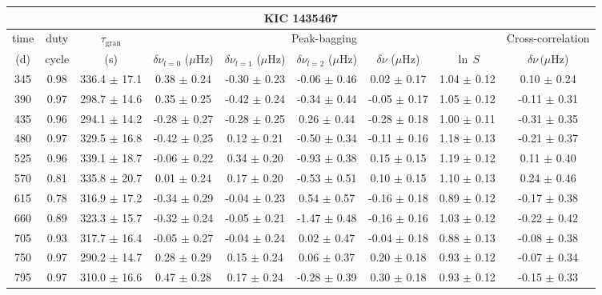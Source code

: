 \documentclass[twocolumn]{aastex61}%
\begin{document}
\FloatBarrier
\begin{table}\centering\fontsize{9.}{7.}\selectfont
\begin{tabular}{ccc|ccccc|c}
\multicolumn{9}{c}{KIC 1435467}\\ \hline\hline
time & duty & $\tau_\text{gran}$ &\multicolumn{5}{c|}{Peak-bagging}&Cross-correlation\\
(d)& cycle & (s)&$\delta\nu_{l=0}$ ($\mu$Hz) & $\delta\nu_{l=1}$ ($\mu$Hz) & $\delta\nu_{l=2}$ ($\mu$Hz) & $\delta\nu$ ($\mu$Hz)& $\ln\,S$ & $\delta\nu\,(\mu$Hz)\\\hline
345 & 0.98 & 336.4 $\pm$ 17.1 & 0.38 $\pm$ 0.24 & -0.30 $\pm$ 0.23 & -0.06 $\pm$ 0.46 & 0.02 $\pm$ 0.17 & 1.04 $\pm$ 0.12 & 0.10 $\pm$ 0.24\\
390 & 0.97 & 298.7 $\pm$ 14.6 & 0.35 $\pm$ 0.25 & -0.42 $\pm$ 0.24 & -0.34 $\pm$ 0.44 & -0.05 $\pm$ 0.17 & 1.05 $\pm$ 0.12 & -0.11 $\pm$ 0.31\\
435 & 0.96 & 294.1 $\pm$ 14.2 & -0.28 $\pm$ 0.27 & -0.28 $\pm$ 0.25 & 0.26 $\pm$ 0.44 & -0.28 $\pm$ 0.18 & 1.00 $\pm$ 0.11 & -0.31 $\pm$ 0.35\\
480 & 0.97 & 329.5 $\pm$ 16.8 & -0.42 $\pm$ 0.25 & 0.12 $\pm$ 0.21 & -0.50 $\pm$ 0.34 & -0.11 $\pm$ 0.16 & 1.18 $\pm$ 0.13 & -0.21 $\pm$ 0.37\\
525 & 0.96 & 339.1 $\pm$ 18.7 & -0.06 $\pm$ 0.22 & 0.34 $\pm$ 0.20 & -0.93 $\pm$ 0.38 & 0.15 $\pm$ 0.15 & 1.19 $\pm$ 0.12 & 0.11 $\pm$ 0.40\\
570 & 0.81 & 335.8 $\pm$ 20.7 & 0.01 $\pm$ 0.24 & 0.17 $\pm$ 0.20 & -0.53 $\pm$ 0.51 & 0.10 $\pm$ 0.15 & 1.10 $\pm$ 0.13 & 0.24 $\pm$ 0.46\\
615 & 0.78 & 316.9 $\pm$ 17.2 & -0.34 $\pm$ 0.29 & -0.04 $\pm$ 0.23 & 0.54 $\pm$ 0.57 & -0.16 $\pm$ 0.18 & 0.89 $\pm$ 0.12 & -0.17 $\pm$ 0.38\\
660 & 0.89 & 323.3 $\pm$ 15.7 & -0.32 $\pm$ 0.24 & -0.05 $\pm$ 0.21 & -1.47 $\pm$ 0.48 & -0.16 $\pm$ 0.16 & 1.03 $\pm$ 0.12 & -0.22 $\pm$ 0.42\\
705 & 0.93 & 317.7 $\pm$ 16.4 & -0.05 $\pm$ 0.27 & -0.04 $\pm$ 0.24 & 0.02 $\pm$ 0.47 & -0.04 $\pm$ 0.18 & 0.88 $\pm$ 0.13 & -0.08 $\pm$ 0.38\\
750 & 0.97 & 290.2 $\pm$ 14.7 & 0.28 $\pm$ 0.29 & 0.15 $\pm$ 0.24 & 0.06 $\pm$ 0.37 & 0.20 $\pm$ 0.18 & 0.93 $\pm$ 0.12 & -0.07 $\pm$ 0.34\\
795 & 0.97 & 310.0 $\pm$ 16.6 & 0.47 $\pm$ 0.28 & 0.17 $\pm$ 0.24 & -0.28 $\pm$ 0.39 & 0.30 $\pm$ 0.18 & 0.93 $\pm$ 0.12 & -0.15 $\pm$ 0.33\\

\end{tabular}
\end{table}
\end{document}
